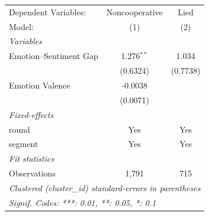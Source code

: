 
\begingroup
\centering
\begin{tabular}{lcc}
   \tabularnewline \midrule \midrule
   Dependent Variables:   & Noncooperative & Lied\\  
   Model:                 & (1)            & (2)\\  
   \midrule
   \emph{Variables}\\
   Emotion--Sentiment Gap & 1.276$^{**}$   & 1.034\\   
                          & (0.6324)       & (0.7738)\\   
   Emotion Valence        & -0.0038        &   \\   
                          & (0.0071)       &   \\   
   \midrule
   \emph{Fixed-effects}\\
   round                  & Yes            & Yes\\  
   segment                & Yes            & Yes\\  
   \midrule
   \emph{Fit statistics}\\
   Observations           & 1,791          & 715\\  
   \midrule \midrule
   \multicolumn{3}{l}{\emph{Clustered (cluster\_id) standard-errors in parentheses}}\\
   \multicolumn{3}{l}{\emph{Signif. Codes: ***: 0.01, **: 0.05, *: 0.1}}\\
\end{tabular}
\par\endgroup


